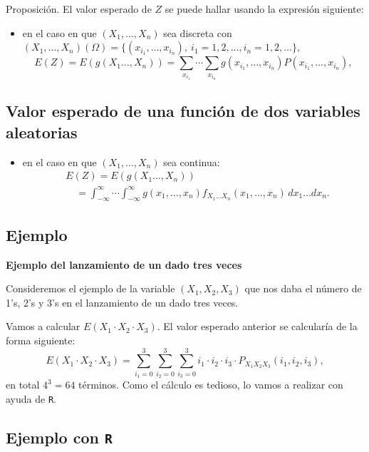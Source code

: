 \documentclass[]{book}
\providecommand{\tightlist}{%
  \setlength{\itemsep}{0pt}\setlength{\parskip}{0pt}}
\begin{document}
Proposición.
El valor esperado de \(Z\) se puede hallar usando la expresión siguiente:

\begin{itemize}
\tightlist
\item
  en el caso en que \((X_1,\ldots,X_n)\) sea discreta con \((X_1,\ldots,X_n)(\Omega)=\{(x_{i_1},\ldots,x_{i_n}),\ i_1=1,2,\ldots, i_n=1,2,\ldots\}\),
  \[
  E(Z)  = E(g(X_1\ldots,X_n))  =\sum_{x_{i_1}}\cdots\sum_{x_{i_n}}g(x_{i_1},\ldots,x_{i_n})P(x_{i_1},\ldots,x_{i_n}),
  \]
\end{itemize}

\hypertarget{valor-esperado-de-una-funciuxf3n-de-dos-variables-aleatorias-5}{%
\subsection{Valor esperado de una función de dos variables aleatorias}\label{valor-esperado-de-una-funciuxf3n-de-dos-variables-aleatorias-5}}

\begin{itemize}
\tightlist
\item
  en el caso en que \((X_1,\ldots,X_n)\) sea continua:
  \[
  \begin{array}{rl}
  & E(Z)=E(g(X_1\ldots,X_n)) \\ & \quad =\int_{-\infty}^\infty\cdots\int_{-\infty}^\infty g(x_1,\ldots,x_n)f_{X_1\ldots X_n}(x_1,\ldots,x_n)\, dx_1\ldots dx_n.
  \end{array}
  \]
\end{itemize}

\hypertarget{ejemplo-127}{%
\subsection{Ejemplo}\label{ejemplo-127}}

\textbf{Ejemplo del lanzamiento de un dado tres veces}

Consideremos el ejemplo de la variable \((X_1,X_2,X_3)\) que nos daba el número de 1's, 2's y 3's en el lanzamiento de un dado tres veces.

Vamos a calcular \(E\left(X_1\cdot X_2\cdot X_3\right)\).
El valor esperado anterior se calcularía de la forma siguiente:
\[
E\left(X_1\cdot X_2\cdot X_3\right)=\sum_{i_1=0}^3\sum_{i_2=0}^3
\sum_{i_3=0}^3 i_1\cdot i_2\cdot i_3\cdot P_{X_1X_2X_3}(i_1,i_2,i_3),
\]
en total \(4^3=64\) términos. Como el cálculo es tedioso, lo vamos a realizar con ayuda de \texttt{R}.

\hypertarget{ejemplo-con-r-21}{%
\subsection{\texorpdfstring{Ejemplo con \texttt{R}}{Ejemplo con R}}\label{ejemplo-con-r-21}}
\end{document}
